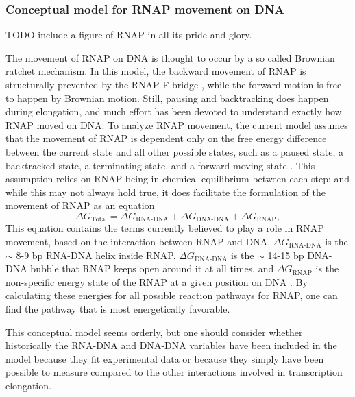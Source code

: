 %

\subsubsection{Conceptual model for RNAP movement on DNA}

TODO include a figure of RNAP in all its pride and glory.

The movement of RNAP on DNA is thought to occur by a so called Brownian ratchet
mechanism. In this model, the backward movement of RNAP is structurally
prevented by the RNAP F bridge \cite{bar-nahum_ratchet_2005}, while the forward
motion is free to happen by Brownian motion. Still, pausing and backtracking
does happen during elongation, and much effort has been devoted to understand
exactly how RNAP moved on DNA. To analyze RNAP movement, the current model
assumes that the movement of RNAP is dependent only on the free energy
difference between the current state and all other possible states, such as a
paused state, a backtracked state, a terminating state, and a forward moving
state \cite{greive_thinking_2005}. This assumption relies on RNAP being in
chemical equilibrium between each step; and while this may not always hold true,
it does facilitate the formulation of the movement of RNAP as an equation \cite{greive_thinking}
\begin{equation}
	\Delta G_{\text{Total}} = \Delta G_{\text{RNA-DNA}} + \Delta
	G_{\text{DNA-DNA}} + \Delta G_{\text{RNAP}},
	\label{eq:rnap_energy_balance}
\end{equation}
This equation contains the terms currently believed to play a role in RNAP
movement, based on the interaction between RNAP and DNA. $\Delta
G_{\text{RNA-DNA}}$ is the $\sim$ 8-9 bp RNA-DNA helix inside RNAP, $\Delta
G_{\text{DNA-DNA}}$ is the $\sim$ 14-15 bp DNA-DNA bubble that RNAP keeps open
around it at all times, and $\Delta G_{\text{RNAP}}$ is the non-specific
energy state of the RNAP at a given position on DNA
\cite{greive_thinking_2005}. By calculating these energies for all possible
reaction pathways for RNAP, one can find the pathway that is most energetically
favorable.

This conceptual model seems orderly, but one should consider whether
historically the RNA-DNA and DNA-DNA variables have been included in the model
because they fit experimental data or because they simply have been possible to
measure compared to the other interactions involved in transcription elongation.

